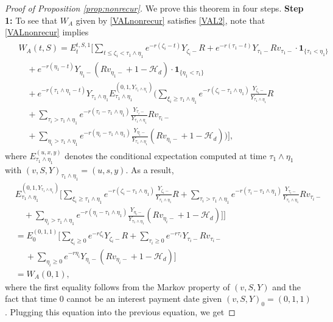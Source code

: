 \documentclass[draft, noinfoline]{ectaart}
\numberwithin{equation}{section}
\theoremstyle{plain}
\begin{document}
\begin{appendices}
\begin{proof}[Proof of Proposition \ref{prop:nonrecur}]
	We prove this theorem in four steps.
	{\flushleft\bf Step 1:} To see that $W_A$ given by \eqref{VALnonrecur} satisfies \eqref{VAL2}, note that \eqref{VALnonrecur} implies
	\begin{align*}
	\begin{split}
	&W_A(t,S)=E_t^{t,S,1}\Bigg[\sum_{t\le\zeta_i<\tau_1\land\eta_1}e^{-r(\zeta_i-t)}Y_{\zeta_i-}R+e^{-r(\tau_1-t)}Y_{\tau_1-}Rv_{\tau_1-}\cdot\mathbf{1}_{\{\tau_1<\eta_1\}}\\
	&\quad+e^{-r(\eta_1-t)}Y_{\eta_1-}(Rv_{\eta_1-}+1-\mathcal{H}_d)\cdot\mathbf{1}_{\{\eta_1<\tau_1\}}\\
	&\quad+e^{-r(\tau_1\land\eta_1-t)}Y_{\tau_1\land\eta_1}E_{\tau_1\land\eta_1}^{(0,1,Y_{\tau_1\land\eta_1})}\Bigg(\sum_{\xi_i\ge\tau_1\land\eta_1}e^{-r(\zeta_i-\tau_1\land\eta_1)}\frac{Y_{\zeta_i-}}{Y_{\tau_1\land\eta_1}}R\\
	&\quad+\sum_{\tau_i>\tau_1\land\eta_1}e^{-r(\tau_i-\tau_1\land\eta_1)}\frac{Y_{\tau_i-}}{Y_{\tau_1\land\eta_1}}Rv_{\tau_i-}\\
	&\quad+\sum_{\eta_i>\tau_1\land\eta_1}e^{-r(\eta_i-\tau_1\land\eta_1)}\frac{Y_{\eta_i-}}{Y_{\tau_1\land\eta_1}}(Rv_{\eta_i-}+1-\mathcal{H}_d)\Bigg)\Bigg],
	\end{split}
	\end{align*}
	where $E_{\tau_1\land\eta_1}^{(u,x,y)}$ denotes the conditional expectation computed at time $\tau_1\land\eta_1$ with $(v,S,Y)_{\tau_1\land\eta_1}=(u,s,y)$. As a result,
	\begin{align*}
	 &E_{\tau_1\land\eta_1}^{(0,1,Y_{\tau_1\land\eta_1})}\Bigg[\sum_{\xi_i\ge\tau_1\land\eta_1}e^{-r(\zeta_i-\tau_1\land\eta_1)}\frac{Y_{\zeta_i-}}{Y_{\tau_1\land\eta_1}}R+\sum_{\tau_i>\tau_1\land\eta_1}e^{-r(\tau_i-\tau_1\land\eta_1)}\frac{Y_{\tau_i-}}{Y_{\tau_1\land\eta_1}}Rv_{\tau_i-}\\
	&\quad+\sum_{\eta_i>\tau_1\land\eta_1}e^{-r(\eta_i-\tau_1\land\eta_1)}\frac{Y_{\eta_i-}}{Y_{\tau_1\land\eta_1}}(Rv_{\eta_i-}+1-\mathcal{H}_d)\Bigg]\Bigg]\\
	&=E_{0}^{(0,1,1)}\Bigg[\sum_{\xi_i\ge0}e^{-r\zeta_i}Y_{\zeta_i-}R+\sum_{\tau_i\ge0}e^{-r\tau_i}Y_{\tau_i-}Rv_{\tau_i-} \\
	&~ \quad +\sum_{\eta_i\ge0}e^{-r\eta_i}Y_{\eta_i-}(Rv_{\eta_i-}+1-\mathcal{H}_d)\Bigg]\\
	&=W_A(0,1),
	\end{align*}
	where the first equality follows from the Markov property of $(v,S,Y)$ and the fact that time 0 cannot be an interest payment date given $(v,S,Y)_0=(0,1,1)$. Plugging this equation into the previous equation, we get

\end{proof}
\end{appendices}
\end{document}
